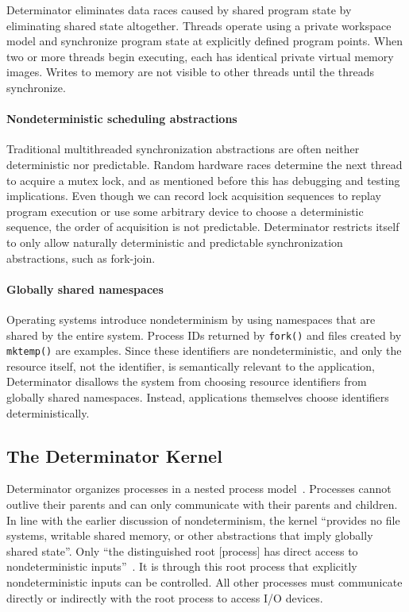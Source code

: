 Determinator eliminates data races caused by shared program state by eliminating
shared state altogether. Threads operate using a private workspace model and
synchronize program state at explicitly defined program points. When two or more
threads begin executing, each has identical private virtual memory images.
Writes to memory are not visible to other threads until the threads synchronize.

\paragraph{Nondeterministic scheduling abstractions}
Traditional multithreaded synchronization abstractions are often neither
deterministic nor predictable. Random hardware races determine the next thread to
acquire a mutex lock, and as mentioned before this has debugging and testing
implications. Even though we can record lock acquisition sequences to replay
program execution or use some arbitrary device to choose a deterministic
sequence, the order of acquisition is not predictable. Determinator restricts
itself to only allow naturally deterministic and predictable synchronization
abstractions, such as fork-join.

\paragraph{Globally shared namespaces}
Operating systems introduce nondeterminism by using namespaces that are shared
by the entire system. Process IDs returned by {\tt fork()} and files created
by {\tt mktemp()} are examples. Since these identifiers are nondeterministic,
and only the resource itself, not the identifier, is semantically relevant to
the application, Determinator disallows the system from choosing resource
identifiers from globally shared namespaces. Instead, applications themselves
choose identifiers deterministically.

\subsection{The Determinator Kernel}

Determinator organizes processes in a nested process model~\cite{Ford96}.
Processes cannot outlive their parents and can only communicate with their
parents and children. In line with the earlier discussion of nondeterminism,
the kernel ``provides no file systems, writable shared memory, or other
abstractions that imply globally shared state''. Only ``the
distinguished root [process] has direct access to nondeterministic
inputs''~\cite{Aviram10}. It is through this root process that explicitly
nondeterministic inputs can be controlled. All other processes must communicate
directly or indirectly with the root process to access I/O devices.

